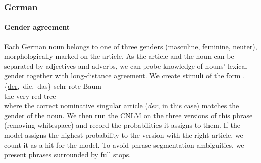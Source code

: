 \subsubsection{German}%


\paragraph{Gender agreement}
Each German noun belongs to one of three genders (masculine, feminine, neuter), morphologically marked on the article. As the article and the noun can be separated by adjectives and adverbs, we can probe knowledge of nouns' lexical gender together with long-distance agreement.
We create stimuli of the form
\exg. \{\underline{der},\ die,\ das\} sehr rote Baum \\
the very red tree \\

where the correct nominative singular article (\emph{der}, in this case) matches the gender of the noun.
We then run the CNLM on the three versions of this phrase (removing whitespace) and record the probabilities it assigns to them. If the model assigns the highest probability to the version with the right article, we count it as a hit for the model. To avoid phrase segmentation ambiguities, we present phrases surrounded by full stops.

